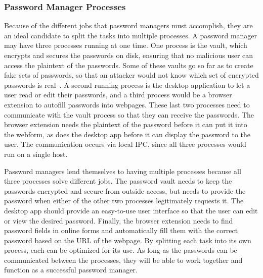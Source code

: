\subsubsection{Password Manager Processes}
\label{sec:passwordManagerProcesses}
Because of the different jobs that password managers must accomplish, they are an ideal candidate to split the tasks into multiple processes.  A password manager may have three processes running at one time.  One process is the vault, which encrypts and secures the passwords on disk, ensuring that no malicious user can access the plaintext of the passwords.  Some of these vaults go so far as to create fake sets of passwords, so that an attacker would not know which set of encrypted passwords is real~\cite{bojinov2010kamouflage}.  A second running process is the desktop application to let a user read or edit their passwords, and a third process would be a browser extension to autofill passwords into webpages.  These last two processes need to communicate with the vault process so that they can receive the passwords.  The browser extension needs the plaintext of the password before it can put it into the webform, as does the desktop app before it can display the password to the user.  The communication occurs via local IPC, since all three processes would run on a single host.

Password managers lend themselves to having multiple processes because all three processes solve different jobs.  The password vault needs to keep the passwords encrypted and secure from outside access, but needs to provide the password when either of the other two processes legitimately requests it.  The desktop app should provide an easy-to-use user interface so that the user can edit or view the desired password.  Finally, the browser extension needs to find password fields in online forms and automatically fill them with the correct password based on the URL of the webpage.  By splitting each task into its own process, each can be optimized for its use.  As long as the passwords can be communicated between the processes, they will be able to work together and function as a successful password manager.

